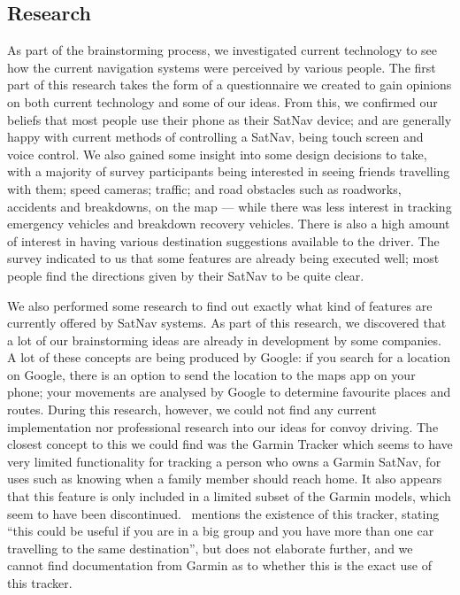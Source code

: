 \documentclass{article}
\begin{document}
\subsection{Research}\label{ssec:nav-research}
As part of the brainstorming process, we investigated current technology to see how the current navigation systems were perceived by various people. The first part of this research takes the form of a questionnaire we created to gain opinions on both current technology and some of our ideas. From this, we confirmed our beliefs that most people use their phone as their SatNav device; and are generally happy with current methods of controlling a SatNav, being touch screen and voice control. We also gained some insight into some design decisions to take, with a majority of survey participants being interested in seeing friends travelling with them; speed cameras; traffic; and road obstacles such as roadworks, accidents and breakdowns, on the map --- while there was less interest in tracking emergency vehicles and breakdown recovery vehicles. There is also a high amount of interest in having various destination suggestions available to the driver. The survey  indicated to us that some features are already being executed well; most people find the directions given by their SatNav to be quite clear.

We also performed some research to find out exactly what kind of features are currently offered by SatNav systems. As part of this research, we discovered that a lot of our brainstorming ideas are already in development by some companies. A lot of these concepts are being produced by Google: if you search for a location on Google, there is an option to send the location to the maps app on your phone; your movements are analysed by Google to determine favourite places and routes.
During this research, however, we could not find any current implementation nor professional research into our ideas for convoy driving. The closest concept to this we could find was the Garmin Tracker
which seems to have very limited functionality for tracking a person who owns a Garmin SatNav, for uses such as knowing when a family member should reach home. It also appears that this feature is only included in a limited subset of the Garmin models, which seem to have been discontinued.~\cite{garmin-tracker}
mentions the existence of this tracker, stating ``this could be useful if you are in a big group and you have more than one car travelling to the same destination'', but does not elaborate further, and we cannot find documentation from Garmin as to whether this is the exact use of this tracker.
\end{document}
